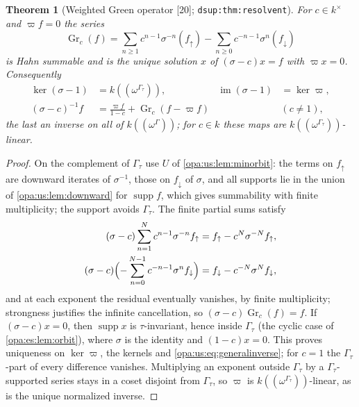 \documentclass[11pt,oneside]{article}
\numberwithin{equation}{section}
\newtheorem{theorem}{Theorem}[section]
\theoremstyle{definition}
\theoremstyle{remark}
\newcommand{\supp}{\operatorname{supp}}
\newcommand{\src}[1]{\textup{\textsf{\small[#1]}}}
\newcommand{\lbl}[1]{\nolinkurl{#1}}
\begin{document}
\begin{theorem}[Weighted Green operator \src{20}; \lbl{dsup:thm:resolvent}]\label{opa:us:thm:green}
For $c\in k^\times$ and $\varpi f=0$ the series
\begin{equation}\label{opa:us:eq:green}
 \operatorname{Gr}_c(f)=\sum_{n\ge1}c^{n-1}\sigma^{-n}(f_\uparrow)-\sum_{n\ge0}c^{-n-1}\sigma^n(f_\downarrow)
\end{equation}
is Hahn summable and is the unique solution $x$ of $(\sigma-c)x=f$ with $\varpi x=0$. Consequently
\begin{align}
 \ker(\sigma-1)&=k((\omega^{\Gamma_\tau})), & \operatorname{im}(\sigma-1)&=\ker\varpi,\label{opa:us:eq:generalexact}\\
 (\sigma-c)^{-1}f&=\frac{\varpi f}{1-c}+\operatorname{Gr}_c(f-\varpi f) && (c\ne1),\label{opa:us:eq:generalinverse}
\end{align}
the last an inverse on all of $k((\omega^\Gamma))$; for $c\in k$ these maps are $k((\omega^{\Gamma_\tau}))$-linear.
\end{theorem}
\begin{proof}
On the complement of $\Gamma_\tau$ use $U$ of \cref{opa:us:lem:minorbit}: the terms on $f_\uparrow$ are downward iterates of $\sigma^{-1}$, those on
$f_\downarrow$ of $\sigma$, and all supports lie in the union of \cref{opa:us:lem:downward} for $\supp f$, which gives summability with finite
multiplicity; the support avoids $\Gamma_\tau$. The finite partial sums satisfy
\begin{align}
 (\sigma-c)\sum_{n=1}^Nc^{n-1}\sigma^{-n}f_\uparrow&=f_\uparrow-c^N\sigma^{-N}f_\uparrow,\label{opa:us:eq:residualup}\\
 (\sigma-c)\Bigl(-\sum_{n=0}^{N-1}c^{-n-1}\sigma^nf_\downarrow\Bigr)&=f_\downarrow-c^{-N}\sigma^Nf_\downarrow,\label{opa:us:eq:residualdown}
\end{align}
and at each exponent the residual eventually vanishes, by finite multiplicity; strongness justifies the infinite cancellation, so
$(\sigma-c)\operatorname{Gr}_c(f)=f$. If $(\sigma-c)x=0$, then $\supp x$ is $\tau$-invariant, hence inside $\Gamma_\tau$ (the cyclic case of
\cref{opa:es:lem:orbit}), where $\sigma$ is the identity and $(1-c)x=0$. This proves uniqueness on $\ker\varpi$, the kernels and
\eqref{opa:us:eq:generalinverse}; for $c=1$ the $\Gamma_\tau$-part of every difference vanishes. Multiplying an exponent outside $\Gamma_\tau$ by a
$\Gamma_\tau$-supported series stays in a coset disjoint from $\Gamma_\tau$, so $\varpi$ is $k((\omega^{\Gamma_\tau}))$-linear, as is the unique
normalized inverse.
\end{proof}
\end{document}
